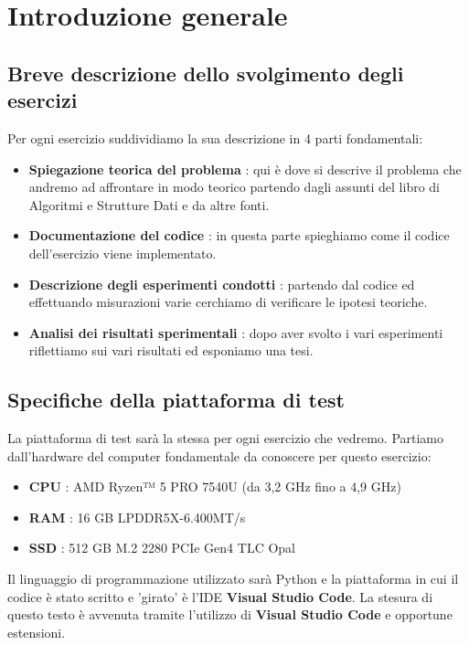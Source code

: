 \documentclass{article}
\begin{document}
\newpage
\renewcommand{\contentsname}{Indice}
\tableofcontents
{}
\newpage
\section{Introduzione generale}
\subsection{Breve descrizione dello svolgimento degli esercizi}
Per ogni esercizio suddividiamo la sua descrizione in 4 parti fondamentali:

\begin{itemize}
    \item \textbf{Spiegazione teorica del problema} : qui è dove si descrive il problema che andremo ad affrontare in modo teorico partendo dagli assunti del libro di Algoritmi e Strutture Dati e da altre fonti.
    \item \textbf{Documentazione del codice} : in questa parte spieghiamo come il codice dell'esercizio viene implementato.
    \item \textbf{Descrizione degli esperimenti condotti} : partendo dal codice ed effettuando misurazioni varie cerchiamo di verificare le ipotesi teoriche.
    \item \textbf{Analisi dei risultati sperimentali} : dopo aver svolto i vari esperimenti riflettiamo sui vari risultati ed esponiamo una tesi.
\end{itemize}

\subsection{Specifiche della piattaforma di test}
La piattaforma di test sarà la stessa per ogni esercizio che vedremo. Partiamo dall'hardware del computer fondamentale da conoscere per questo esercizio:

\begin{itemize}
    \item \textbf{CPU} : AMD Ryzen™ 5 PRO 7540U (da 3,2 GHz fino a 4,9 GHz)
    \item \textbf{RAM} : 16 GB LPDDR5X-6.400MT/s
    \item \textbf{SSD} : 512 GB M.2 2280 PCIe Gen4 TLC Opal
\end{itemize}

Il linguaggio di programmazione utilizzato sarà Python e la piattaforma in cui il codice è stato scritto e 'girato' è l'IDE \textbf{Visual Studio Code}. La stesura di questo testo è avvenuta tramite l'utilizzo di \textbf{Visual Studio Code} e opportune estensioni.
\end{document}

